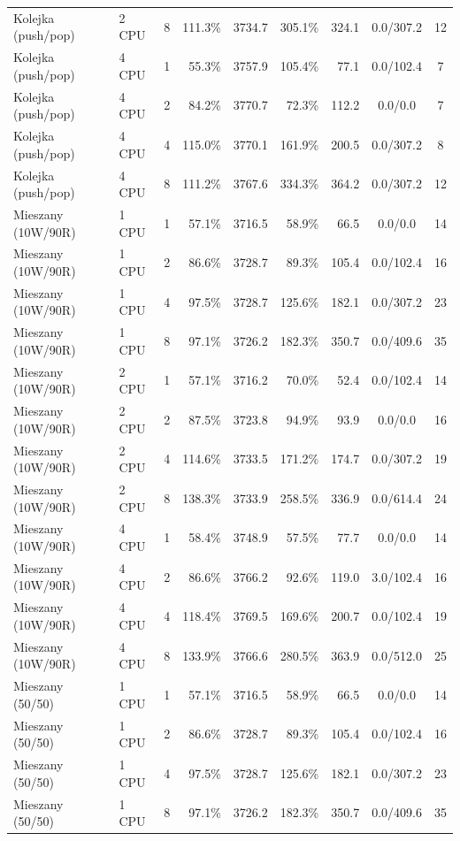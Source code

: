\begin{table}[ht]
{\begin{tabular}{llcrrrrcc}
Kolejka (push/pop) & 2 CPU & 8 & 111.3\% & 3734.7 & 305.1\% & 324.1 & 0.0/307.2 & 12 \\
Kolejka (push/pop) & 4 CPU & 1 & 55.3\% & 3757.9 & 105.4\% & 77.1 & 0.0/102.4 & 7 \\
Kolejka (push/pop) & 4 CPU & 2 & 84.2\% & 3770.7 & 72.3\% & 112.2 & 0.0/0.0 & 7 \\
Kolejka (push/pop) & 4 CPU & 4 & 115.0\% & 3770.1 & 161.9\% & 200.5 & 0.0/307.2 & 8 \\
Kolejka (push/pop) & 4 CPU & 8 & 111.2\% & 3767.6 & 334.3\% & 364.2 & 0.0/307.2 & 12 \\
Mieszany (10W/90R) & 1 CPU & 1 & 57.1\% & 3716.5 & 58.9\% & 66.5 & 0.0/0.0 & 14 \\
Mieszany (10W/90R) & 1 CPU & 2 & 86.6\% & 3728.7 & 89.3\% & 105.4 & 0.0/102.4 & 16 \\
Mieszany (10W/90R) & 1 CPU & 4 & 97.5\% & 3728.7 & 125.6\% & 182.1 & 0.0/307.2 & 23 \\
Mieszany (10W/90R) & 1 CPU & 8 & 97.1\% & 3726.2 & 182.3\% & 350.7 & 0.0/409.6 & 35 \\
Mieszany (10W/90R) & 2 CPU & 1 & 57.1\% & 3716.2 & 70.0\% & 52.4 & 0.0/102.4 & 14 \\
Mieszany (10W/90R) & 2 CPU & 2 & 87.5\% & 3723.8 & 94.9\% & 93.9 & 0.0/0.0 & 16 \\
Mieszany (10W/90R) & 2 CPU & 4 & 114.6\% & 3733.5 & 171.2\% & 174.7 & 0.0/307.2 & 19 \\
Mieszany (10W/90R) & 2 CPU & 8 & 138.3\% & 3733.9 & 258.5\% & 336.9 & 0.0/614.4 & 24 \\
Mieszany (10W/90R) & 4 CPU & 1 & 58.4\% & 3748.9 & 57.5\% & 77.7 & 0.0/0.0 & 14 \\
Mieszany (10W/90R) & 4 CPU & 2 & 86.6\% & 3766.2 & 92.6\% & 119.0 & 3.0/102.4 & 16 \\
Mieszany (10W/90R) & 4 CPU & 4 & 118.4\% & 3769.5 & 169.6\% & 200.7 & 0.0/102.4 & 19 \\
Mieszany (10W/90R) & 4 CPU & 8 & 133.9\% & 3766.6 & 280.5\% & 363.9 & 0.0/512.0 & 25 \\
Mieszany (50/50) & 1 CPU & 1 & 57.1\% & 3716.5 & 58.9\% & 66.5 & 0.0/0.0 & 14 \\
Mieszany (50/50) & 1 CPU & 2 & 86.6\% & 3728.7 & 89.3\% & 105.4 & 0.0/102.4 & 16 \\
Mieszany (50/50) & 1 CPU & 4 & 97.5\% & 3728.7 & 125.6\% & 182.1 & 0.0/307.2 & 23 \\
Mieszany (50/50) & 1 CPU & 8 & 97.1\% & 3726.2 & 182.3\% & 350.7 & 0.0/409.6 & 35 \\

\end{tabular}}
\end{table}
